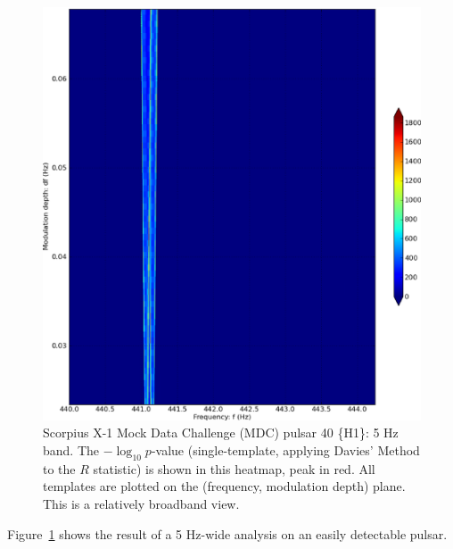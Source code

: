\begin{figure}
\begin{center}
\includegraphics[width=0.65\paperwidth,height=0.5\paperheight]{plots/bandH1-bold.eps}
\caption{
Scorpius X-1 Mock Data Challenge (MDC) pulsar 40 \{H1\}: 5 Hz band. 
The $-\log_{10}p$-value (single-template, applying Davies' Method to the $R$ statistic) is shown in this heatmap, peak in red. 
All templates are plotted on the (frequency, modulation depth) plane.
This is a relatively broadband view.
}
\label{scox1-wide-heatmap-040}
\end{center}
\end{figure}


Figure~\ref{scox1-wide-heatmap-040} shows the result of a 5 Hz-wide analysis on an easily detectable pulsar.

